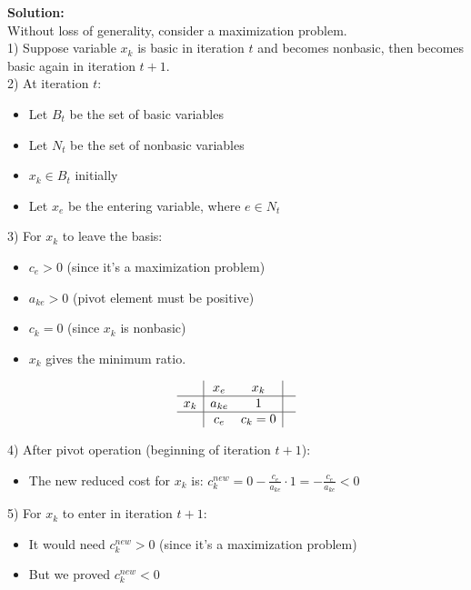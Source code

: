 \documentclass{article}
\begin{document}
\textbf{Solution:} \\

Without loss of generality, consider a maximization problem. \\

1) Suppose variable $x_k$ is basic in iteration $t$ and becomes nonbasic, then becomes basic again in iteration $t+1$. \\

2) At iteration $t$:
    \begin{itemize}
    \item Let $B_t$ be the set of basic variables
    \item Let $N_t$ be the set of nonbasic variables
    \item $x_k \in B_t$ initially
    \item Let $x_e$ be the entering variable, where $e \in N_t$
    \end{itemize}

3) For $x_k$ to leave the basis:
    \begin{itemize}
    \item ${c}_e > 0$ (since it's a maximization problem)
    \item $a_{ke} > 0$ (pivot element must be positive)
    \item $c_k = 0$ (since $x_k$ is nonbasic)
    \item $x_k$ gives the minimum ratio.
    \end{itemize}

\[
\begin{array}{c|cc|c}
    & x_e & x_k & \\
\hline
    x_k & a_{ke} & 1 & \\
    \hline
    & c_e & c_k = 0 &  \\
\end{array}
\]

4) After pivot operation (beginning of iteration $t+1$):
    \begin{itemize}
    \item The new reduced cost for $x_k$ is:
     ${c}_k^{new} = 0 - \frac{{c}_e}{a_{ke}} \cdot 1 = - \frac{{c}_e}{a_{ke}} < 0$
    \end{itemize}

5) For $x_k$ to enter in iteration $t+1$:
    \begin{itemize}
    \item It would need ${c}_k^{new} > 0$ (since it's a maximization problem)
    \item But we proved ${c}_k^{new} < 0$
    \end{itemize}
\end{document}
